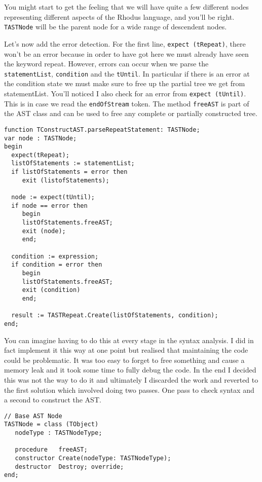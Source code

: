 You might start to get the feeling that we will have quite a few different nodes representing different aspects of the Rhodus language, and you'll be right. {\tt TASTNode} will be the parent node for a wide range of descendent nodes.

Let's now add the error detection. For the first line, {\tt expect (tRepeat)}, there won't be an error because in order to have got here we must already have seen the keyword repeat.  However, errors can occur when we parse the {\tt statementList}, {\tt condition} and the {\tt tUntil}. In particular if there is an error at the condition state we must make sure to free up the partial tree we get from statementList. You'll noticed I also check for an error from {\tt expect (tUntil)}. This is in case we read the {\tt endOfStream} token. The method {\tt freeAST} is part of the AST class and can be used to free any complete or partially constructed tree.

\begin{lstlisting}
function TConstructAST.parseRepeatStatement: TASTNode;
var node : TASTNode;
begin
  expect(tRepeat);
  listOfStatements := statementList;
  if listOfStatements = error then
     exit (listofStatements);

  node := expect(tUntil);
  if node == error then
     begin
     listOfStatements.freeAST;
     exit (node);
     end;

  condition := expression;
  if condition = error then
     begin
     listOfStatements.freeAST;
     exit (condition)
     end;

  result := TASTRepeat.Create(listOfStatements, condition);
end;
\end{lstlisting}

You can imagine having to do this at every stage in the syntax analysis. I did in fact implement it this way at one point but realised that maintaining the code could be problematic. It was too easy to forget to free something and cause a memory leak and it took some time to fully debug the code. In the end I decided this was not the way to do it and ultimately I discarded the work and reverted to the first solution which involved doing two passes. One pass to check syntax and a second to construct the AST.

\begin{lstlisting}
// Base AST Node
TASTNode = class (TObject)
   nodeType : TASTNodeType;

   procedure   freeAST;
   constructor Create(nodeType: TASTNodeType);
   destructor  Destroy; override;
end;
\end{lstlisting}

